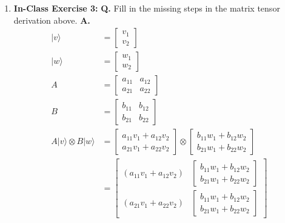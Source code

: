 \documentclass[main.tex]{subfiles}
\begin{document}
\begin{enumerate}
\item[] \textbf{In-Class Exercise 3:} \textbf{Q.} Fill in the missing steps in the matrix tensor derivation above. \textbf{A.}
    \begin{align*}
    |v\rangle                       & = \left[\begin{array}{l} v_{1} \\ v_{2} \end{array}\right] \\
    |w\rangle                       & = \left[\begin{array}{l} w_{1} \\ w_{2} \end{array}\right] \\
    A                               & = \left[\begin{array}{ll} a_{11} & a_{12} \\ a_{21} & a_{22} \end{array}\right] \\
    B                               & = \left[\begin{array}{ll} b_{11} & b_{12} \\ b_{21} & b_{22} \end{array}\right] \\
    A|v\rangle \otimes B|w\rangle   & = \left[\begin{array}{l} a_{11} v_{1}+a_{12} v_{2} \\ a_{21} v_{1}+a_{22} v_{2} \end{array}\right] 
                                    \otimes\left[\begin{array}{l} b_{11} w_{1}+b_{12} w_{2} \\ b_{21} w_{1}+b_{22} w_{2} \end{array}\right] \\
                                    & = \left[\begin{array}{ll} \left(a_{11} v_{1}+a_{12} v_{2}\right) 
                                    & {\left[\begin{array}{l} b_{11} w_{1}+b_{12} w_{2} \\ b_{21} w_{1}+b_{22} w_{2} \end{array}\right]} \\
                                    \left(a_{21} v_{1}+a_{22} v_{2}\right) & {\left[\begin{array}{l} b_{11} w_{1}+b_{12} w_{2} \\
                                    b_{21} w_{1}+b_{22} w_{2} \end{array}\right]} \end{array}\right] \\

\end{align*}
\end{enumerate}
\end{document}
